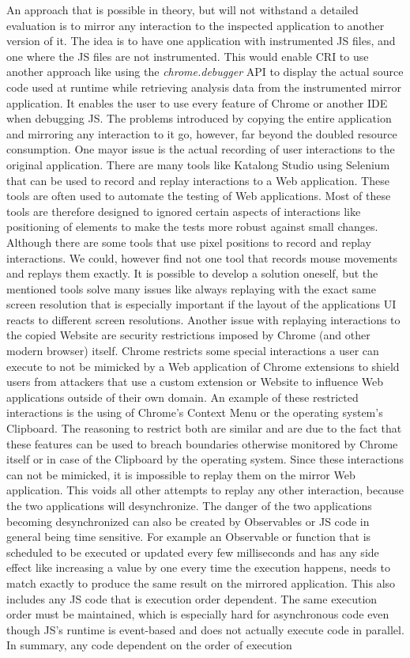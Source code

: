 An approach that is possible in theory, but will not withstand a detailed evaluation is to mirror any interaction to the inspected application to another version of it. The idea is to have one application with instrumented JS files, and one where the JS files are not instrumented. This would enable CRI to use another approach like using the \emph{chrome.debugger} API to display the actual source code used at runtime while retrieving analysis data from the instrumented mirror application. It enables the user to use every feature of Chrome or another IDE when debugging JS. The problems introduced by copying the entire application and mirroring any interaction to it go, however, far beyond the doubled resource consumption. One mayor issue is the actual recording of user interactions to the original application. There are many tools like Katalong Studio \cite{Katalon} using Selenium \cite{Selenium} that can be used to record and replay interactions to a Web application. These tools are often used to automate the testing of Web applications. Most of these tools are therefore designed to ignored certain aspects of interactions like positioning of elements to make the tests more robust against small changes. Although there are some tools that use pixel positions to record and replay interactions. We could, however find not one tool that records mouse movements and replays them exactly. It is possible to develop a solution oneself, but the mentioned tools solve many issues like always replaying with the exact same screen resolution that is especially important if the layout of the applications UI reacts to different screen resolutions. Another issue with replaying interactions to the copied Website are security restrictions imposed by Chrome (and other modern browser) itself. Chrome restricts some special interactions a user can execute to not be mimicked by a Web application of Chrome extensions to shield users from attackers that use a custom extension or Website to influence Web applications outside of their own domain. An example of these restricted interactions is the using of Chrome's Context Menu or the operating system's Clipboard. The reasoning to restrict both are similar and are due to the fact that these features can be used to breach boundaries otherwise monitored by Chrome itself or in case of the Clipboard by the operating system. Since these interactions can not be mimicked, it is impossible to replay them on the mirror Web application. This voids all other attempts to replay any other interaction, because the two applications will desynchronize. The danger of the two applications becoming desynchronized can also be created by Observables or JS code in general being time sensitive. For example an Observable or function that is scheduled to be executed or updated every few milliseconds and has any side effect like increasing a value by one every time the execution happens, needs to match exactly to produce the same result on the mirrored application. This also includes any JS code that is execution order dependent. The same execution order must be maintained, which is especially hard for asynchronous code even though JS's runtime is event-based \cite{EventBasedJS} and does not actually execute code in parallel. In summary, any code dependent on the order of execution 